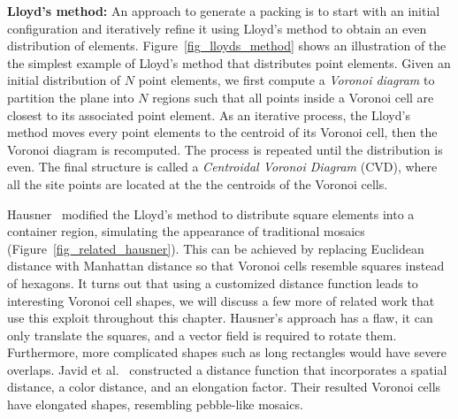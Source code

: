 
\textbf{Lloyd's method:}
An approach to generate a packing is to start with an initial configuration and iteratively refine it using Lloyd's method
to obtain an even distribution of elements. 
Figure~\ref{fig_lloyds_method} shows an illustration of the the simplest example of 
Lloyd's method that distributes point elements.
Given an initial distribution of $N$ point elements, 
we first compute a \textit{Voronoi diagram} to partition the plane into $N$ regions such that
all points inside a Voronoi cell are closest to its associated point element.
As an iterative process, 
the Lloyd's method moves every point elements to the centroid of its Voronoi cell, 
then the Voronoi diagram is recomputed.
The process is repeated until the distribution is even.
The final structure is called a \textit{Centroidal Voronoi Diagram} (CVD), 
where all the site points are located at the the centroids of the Voronoi cells. 

Hausner~\cite{Hausner2001} modified the Lloyd's method to distribute square elements into a container 
region, simulating the appearance of traditional mosaics (Figure~\ref{fig_related_hausner}). 
This can be achieved by replacing Euclidean distance with Manhattan distance so that Voronoi cells resemble squares instead of hexagons.
It turns out that using a customized distance function leads to interesting Voronoi cell shapes,
we will discuss a few more of related work that use this exploit throughout this chapter. 
Hausner's approach has a flaw, it can only translate the squares, and a vector field is required to rotate them.
Furthermore, more complicated shapes such as long rectangles would have severe overlaps.
Javid et al.~\cite{Javid2019} constructed a distance function that 
incorporates a spatial distance, a color distance, and an elongation factor. Their resulted
Voronoi cells have elongated shapes, resembling pebble-like mosaics.

